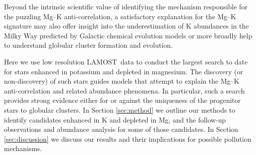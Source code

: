 \documentclass[a4paper,fleqn,usenatbib]{mnras}
\newcommand{\LamostGiants}{454,180}
\newcommand{\project}[1]{#1}
\newcommand{\lamost}{\project{LAMOST}}
\begin{document}

Beyond the intrinsic scientific value of identifying the mechanism responsible for the puzzling Mg--K anti-correlation, a satisfactory explanation for the Mg--K signature may also offer insight into the underestimation of K abundances in the Milky Way predicted by Galactic chemical evolution models \citep{kobayashi2011} or more broadly help to understand globular cluster formation and evolution. 

Here we use low resolution \lamost\ data to conduct the largest search to date for stars enhanced in potassium and depleted in magnesium. The discovery (or non-discovery) of such stars guides models that attempt to explain the Mg--K anti-correlation and related abundance phenomena. In particular, such a search provides strong evidence either for or against the uniqueness of the progenitor stars to globular clusters. In Section \ref{sec:method} we outline our methods to identify candidates enhanced in K and depleted in Mg, and the follow-up observations and abundance analysis for some of those candidates. In Section \ref{sec:discussion} we discuss our results and their implications for possible pollution mechanisms. 


\end{document}
